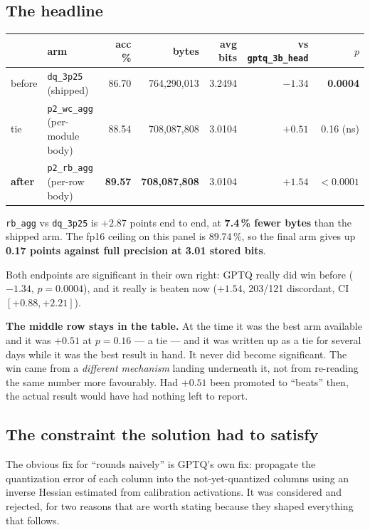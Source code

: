 \documentclass[11pt]{article}
\newcommand{\pct}{\,\%}
\newcommand{\code}[1]{\texttt{#1}}
\newcommand{\best}[1]{\textbf{#1}}
\newenvironment{aside}%
{\par\needspace{4\baselineskip}\vspace{0.8ex}%
\begin{lrbox}{\asidebox}\begin{minipage}{\dimexpr\textwidth-18pt\relax}\small}%
{\end{minipage}\end{lrbox}%
\noindent\setlength{\fboxsep}{9pt}\colorbox{warnbg}{\usebox{\asidebox}}%
\vspace{0.6ex}\par}
\begin{document}
\subsection{The headline}

\begin{center}\small
\begin{tabular}{@{}llrrrrr@{}}
\toprule
 & arm & acc \% & bytes & avg bits & vs \code{gptq\_3b\_head} & $p$ \\
\midrule
before & \code{dq\_3p25} (shipped) & 86.70 & 764{,}290{,}013 & 3.2494 & \best{$-1.34$} & \best{0.0004} \\
tie & \code{p2\_wc\_agg} (per-module body) & 88.54 & 708{,}087{,}808 & 3.0104 & $+0.51$ & 0.16 (ns) \\
\rowcolor{winbg}
\textbf{after} & \code{p2\_rb\_agg} (per-row body) & \best{89.57} & \best{708{,}087{,}808} & 3.0104 & \best{$+1.54$} & \best{$<0.0001$} \\
\bottomrule
\end{tabular}
\end{center}

\code{rb\_agg} vs \code{dq\_3p25} is $+2.87$ points end to end, at \textbf{7.4\pct{} fewer bytes}
than the shipped arm. The fp16 ceiling on this panel is 89.74\pct, so the final arm gives up
\textbf{0.17 points against full precision at 3.01 stored bits}.

Both endpoints are significant in their own right: GPTQ really did win before ($-1.34$,
$p = 0.0004$), and it really is beaten now ($+1.54$, 203/121 discordant, CI $[+0.88, +2.21]$).

\begin{aside}
\textbf{The middle row stays in the table.} At the time it was the best arm available and it was
$+0.51$ at $p = 0.16$ --- a tie --- and it was written up as a tie for several days while it was
the best result in hand. It never did become significant. The win came from a \emph{different
mechanism} landing underneath it, not from re-reading the same number more favourably. Had
$+0.51$ been promoted to ``beats'' then, the actual result would have had nothing left to report.
\end{aside}

\subsection{The constraint the solution had to satisfy}

The obvious fix for ``rounds naively'' is GPTQ's own fix: propagate the quantization error of each
column into the not-yet-quantized columns using an inverse Hessian estimated from calibration
activations. It was considered and rejected, for two reasons that are worth stating because they
shaped everything that follows.
\end{document}
